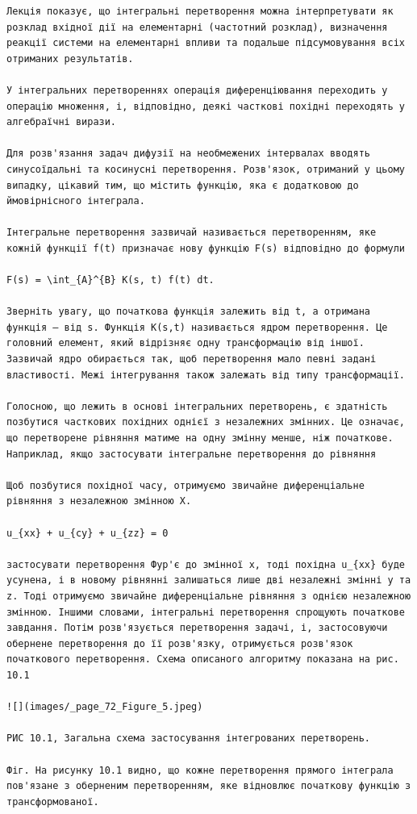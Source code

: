 \documentclass[
  ukrainian,
]{article}
\begin{document}
\begin{verbatim}
Лекція показує, що інтегральні перетворення можна інтерпретувати як розклад вхідної дії на елементарні (частотний розклад), визначення реакції системи на елементарні впливи та подальше підсумовування всіх отриманих результатів.

У інтегральних перетвореннях операція диференціювання переходить у операцію множення, і, відповідно, деякі часткові похідні переходять у алгебраїчні вирази.

Для розв'язання задач дифузії на необмежених інтервалах вводять синусоїдальні та косинусні перетворення. Розв'язок, отриманий у цьому випадку, цікавий тим, що містить функцію, яка є додатковою до ймовірнісного інтеграла.

Інтегральне перетворення зазвичай називається перетворенням, яке кожній функції f(t) призначає нову функцію F(s) відповідно до формули

F(s) = \int_{A}^{B} K(s, t) f(t) dt.

Зверніть увагу, що початкова функція залежить від t, а отримана функція — від s. Функція K(s,t) називається ядром перетворення. Це головний елемент, який відрізняє одну трансформацію від іншої. Зазвичай ядро обирається так, щоб перетворення мало певні задані властивості. Межі інтегрування також залежать від типу трансформації.

Голосною, що лежить в основі інтегральних перетворень, є здатність позбутися часткових похідних однієї з незалежних змінних. Це означає, що перетворене рівняння матиме на одну змінну менше, ніж початкове. Наприклад, якщо застосувати інтегральне перетворення до рівняння

Щоб позбутися похідної часу, отримуємо звичайне диференціальне рівняння з незалежною змінною X.

u_{xx} + u_{cy} + u_{zz} = 0

застосувати перетворення Фур'є до змінної x, тоді похідна u_{xx} буде усунена, і в новому рівнянні залишаться лише дві незалежні змінні y та z. Тоді отримуємо звичайне диференціальне рівняння з однією незалежною змінною. Іншими словами, інтегральні перетворення спрощують початкове завдання. Потім розв'язується перетворення задачі, і, застосовуючи обернене перетворення до її розв'язку, отримується розв'язок початкового перетворення. Схема описаного алгоритму показана на рис. 10.1

![](images/_page_72_Figure_5.jpeg)

РИС 10.1, Загальна схема застосування інтегрованих перетворень.

Фіг. На рисунку 10.1 видно, що кожне перетворення прямого інтеграла пов'язане з оберненим перетворенням, яке відновлює початкову функцію з трансформованої.


\end{verbatim}
\end{document}

